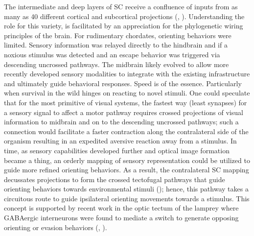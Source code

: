 \documentclass{ar-1col}
\begin{document}
{The intermediate and deep layers of SC receive a confluence of inputs from as many as 40 different cortical and subcortical projections (\cite{edwards1979sources}, \cite{huerta1984connectional}). Understanding the role for this variety, is facilitated by an appreciation for the phylogenetic wiring principles of the brain. For rudimentary chordates, orienting behaviors were limited. Sensory information was relayed directly to the hindbrain and if a noxious stimulus was detected and an escape behavior was triggered via descending uncrossed pathways. The midbrain likely evolved to allow more recently developed sensory modalities to integrate with the existing infrastructure and ultimately guide behavioral responses. Speed is of the essence. Particularly when survival in the wild hinges on reacting to novel stimuli. One could speculate that for the most primitive of visual systems, the fastest way (least synapses) for a sensory signal to affect a motor pathway requires crossed projections of visual information to midbrain and on to the descending uncrossed pathways; such a connection would facilitate a faster contraction along the contralateral side of the organism resulting in an expedited aversive reaction away from a stimulus. In time, as sensory capabilities developed further and optical image formation became a thing, an orderly mapping of sensory representation could be utilized to guide more refined orienting behaviors. As a result, the contralateral SC mapping decussates projections to form the crossed tectofugal pathways that guide orienting behaviors towards environmental stimuli (\cite{schneider2014brain}); hence, this pathway takes a circuitous route to guide ipsilateral orienting movements towards a stimulus. This concept is supported by recent work in the optic tectum of the lamprey where GABAergic interneurons were found to mediate a switch to generate opposing orienting or evasion behaviors (\cite{saitoh2007tectal}, \cite{suzuki2019role}).
}
\end{document}
